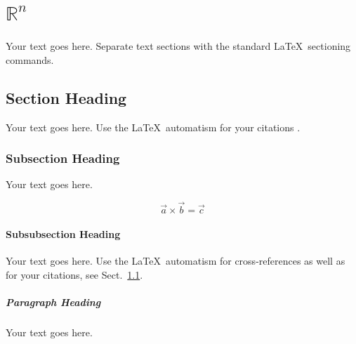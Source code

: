 %
%
%

\chapter{$\mathbb R^n$}
\label{Rn} %

Your text goes here. Separate text sections with the standard \LaTeX\
sectioning commands.

\section{Section Heading}
\label{sec:1}
Your text goes here. Use the \LaTeX\ automatism for your citations
\cite{monograph}.

\subsection{Subsection Heading}
\label{sec:2}
Your text goes here.

\begin{equation}
\vec{a}\times\vec{b}=\vec{c}
\end{equation}

\subsubsection{Subsubsection Heading}
Your text goes here. Use the \LaTeX\ automatism for cross-references as
well as for your citations, see Sect.~\ref{sec:1}.

\paragraph{Paragraph Heading} %
Your text goes here.

